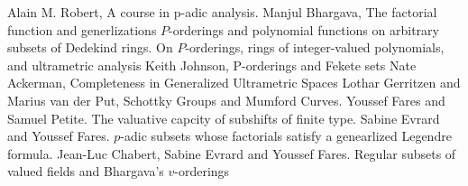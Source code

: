 \documentclass[12pt]{report}
\theoremstyle{definition}
\begin{document}
%	
\begin{thebibliography}{1}
 Alain M. Robert, A course in p-adic analysis.
 Manjul Bhargava, The factorial function and generlizations
 $P$-orderings and polynomial functions on arbitrary subsets of Dedekind rings.
 On $ P$-orderings, rings of integer-valued polynomials, and ultrametric analysis
 Keith Johnson, P-orderings and Fekete sets
 Nate Ackerman,  Completeness in Generalized Ultrametric Spaces
 Lothar Gerritzen and Marius van der Put, Schottky Groups and Mumford Curves.
 Youssef Fares and Samuel Petite. The valuative capcity of subshifts of finite type.
 Sabine Evrard and Youssef Fares. $p$-adic subsets whose factorials satisfy a genearlized Legendre formula.
 Jean-Luc Chabert, Sabine Evrard and Youssef Fares. Regular subsets of valued fields and Bhargava’s $v$-orderings
\end{thebibliography}
\end{document}
